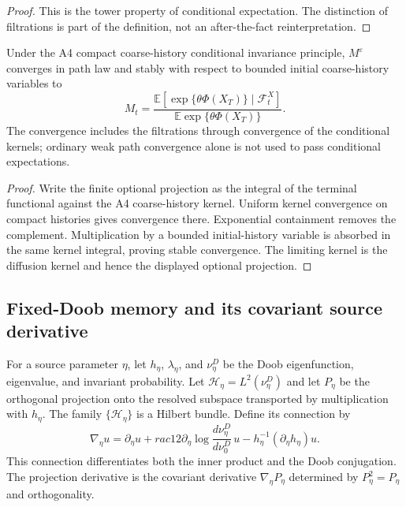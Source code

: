 \begin{proof}
This is the tower property of conditional expectation.  The distinction of
filtrations is part of the definition, not an after-the-fact reinterpretation.
\end{proof}

\begin{theorem}
\label{thm:r7-c2-optional}
Under the A4 compact coarse-history conditional invariance principle,
$M^\varepsilon$ converges in path law and stably with respect to bounded
initial coarse-history variables to
\[
 M_t=
 \frac{\mathbb E[\exp\{\theta\Phi(X_T)\}
      \mid\mathcal F_t^X]}
      {\mathbb E\exp\{\theta\Phi(X_T)\}}.
\]
The convergence includes the filtrations through convergence of the conditional
kernels; ordinary weak path convergence alone is not used to pass conditional
expectations.
\end{theorem}

\begin{proof}
Write the finite optional projection as the integral of the terminal
functional against the A4 coarse-history kernel.  Uniform kernel convergence
on compact histories gives convergence there.  Exponential containment removes
the complement.  Multiplication by a bounded initial-history variable is
absorbed in the same kernel integral, proving stable convergence.  The limiting
kernel is the diffusion kernel and hence the displayed optional projection.
\end{proof}

\subsection{Fixed-Doob memory and its covariant source derivative}

For a source parameter $\eta$, let
$h_\eta$, $\lambda_\eta$, and $\nu_\eta^D$ be the Doob eigenfunction,
eigenvalue, and invariant probability.  Let
$\mathcal H_\eta=L^2(\nu_\eta^D)$ and let $P_\eta$ be the orthogonal projection
onto the resolved subspace transported by multiplication with $h_\eta$.
The family $\{\mathcal H_\eta\}$ is a Hilbert bundle.  Define its connection by
\[
 \nabla_\eta u
 =\partial_\eta u+rac12
  \partial_\eta\log\frac{d\nu_\eta^D}{d\nu_0^D}\,u
 -h_\eta^{-1}(\partial_\eta h_\eta)u.
\]
This connection differentiates both the inner product and the Doob
conjugation.  The projection derivative is the covariant derivative
$\nabla_\eta P_\eta$ determined by $P_\eta^2=P_\eta$ and orthogonality.

